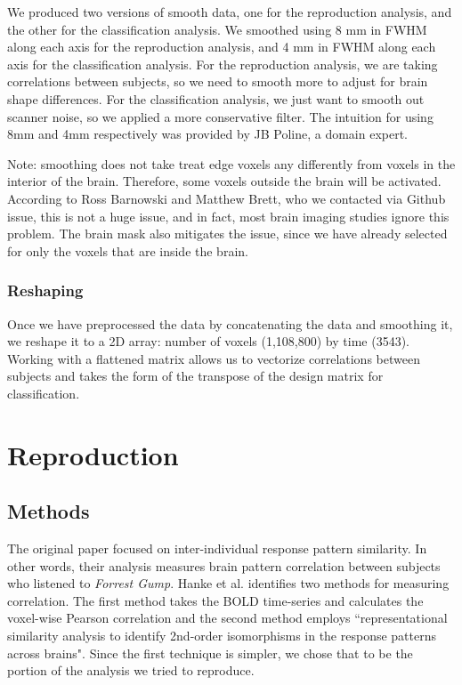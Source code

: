 \documentclass[11pt]{article}
\begin{document}
We produced two versions of smooth data, one for the reproduction analysis, and
the other for the classification analysis.  We smoothed using 8 mm in FWHM along each axis
for the reproduction analysis, and 4 mm in FWHM along each axis for the classification
analysis.  For the reproduction analysis, we are taking correlations between
subjects, so we need to smooth more to adjust for brain shape differences. For the classification analysis, we just want to smooth out scanner noise, so we applied a more conservative filter. The intuition for using 8mm and 4mm respectively was provided by JB Poline, a domain expert.

Note: smoothing does not take treat edge voxels any differently from voxels in the 
interior of the brain.  Therefore, some voxels outside the brain will be activated.  
According to Ross Barnowski and Matthew Brett, who we contacted via Github issue, 
this is not a huge issue, and in fact, most brain imaging studies ignore this 
problem.  The brain mask also mitigates the issue, since we have already selected 
for only the voxels that are inside the brain.

\subsubsection{Reshaping}
Once we have preprocessed the data by concatenating the data and smoothing it,
we reshape it to a 2D array: number of voxels (1,108,800) by time (3543). Working with a flattened matrix allows us to vectorize correlations between subjects and takes the form of the transpose of the design matrix for classification.  

\section{Reproduction}

\subsection{Methods}

The original paper focused on inter-individual response pattern similarity. In
other words, their analysis measures brain pattern correlation between
subjects who listened to \emph{Forrest Gump}. Hanke et al. identifies two 
methods for measuring correlation. The first method takes the BOLD time-series 
and calculates the voxel-wise Pearson correlation and the second method employs
``representational similarity analysis to identify 2nd-order isomorphisms in
the response patterns across brains"\cite{hank2014audiomovie}.  Since the first 
technique is simpler, we chose that to be the portion of the analysis we tried 
to reproduce. 
\end{document}

